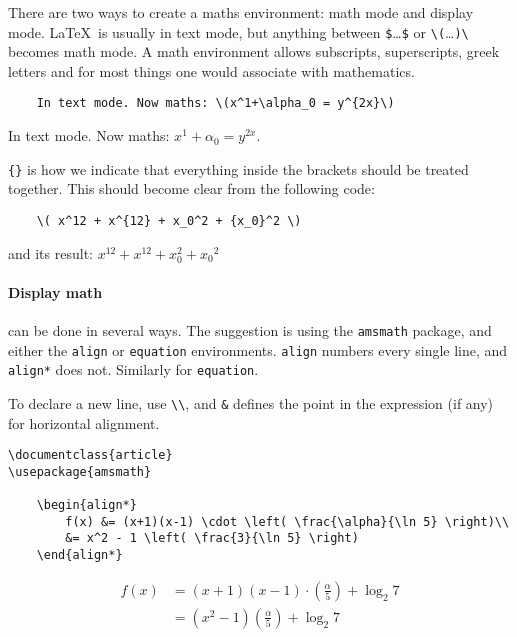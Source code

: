 There are two ways to create a maths environment: math mode and display mode.
\LaTeX\ is usually in text mode, but anything between \verb|$|\dots\verb|$| or \verb|\(|\dots \verb|)\| becomes math mode\footnotemark.
A math environment allows subscripts, superscripts, greek letters and for most things one would associate with mathematics.
\begin{lstlisting}
    In text mode. Now maths: \(x^1+\alpha_0 = y^{2x}\)
\end{lstlisting}

In text mode. Now maths: \(x^1+\alpha_0 = y^{2x}\).

\verb|{}| is how we indicate that everything inside the brackets should be treated together.
This should become clear from the following code:
\begin{lstlisting}
    \( x^12 + x^{12} + x_0^2 + {x_0}^2 \)
\end{lstlisting}
and its result: \( x^12 + x^{12} + x_0^2 + {x_0}^2 \)

\paragraph{Display math} can be done in several ways.
The suggestion is using the \verb|amsmath| package, and either the \verb|align| or \verb|equation| environments.
\texttt{align} numbers every single line, and \texttt{align*} does not. Similarly for \verb|equation|.

To declare a new line, use \verb|\\|, and \verb|&| defines the point in the expression (if any) for horizontal alignment.
\begin{lstlisting}
\documentclass{article}
\usepackage{amsmath}

    \begin{align*}
        f(x) &= (x+1)(x-1) \cdot \left( \frac{\alpha}{\ln 5} \right)\\
        &= x^2 - 1 \left( \frac{3}{\ln 5} \right)
    \end{align*}

\end{lstlisting}
\begin{align*}
    f(x) &= (x+1)(x-1) \cdot \left( \frac{\alpha}{5} \right) + \log_{2} 7\\
    &= (x^2 - 1)  (\frac{\alpha}{5} ) + \log_{2} 7
\end{align*}

